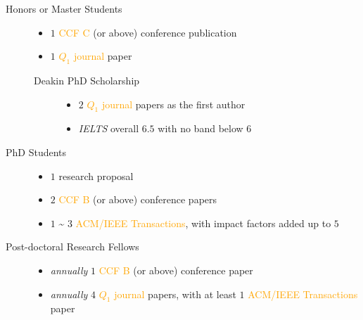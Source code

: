 \documentclass{tikzposter} %
\begin{document}
\begin{columns}
{
	\begin{description}
		\item[Honors or Master Students] \hfill
		\begin{itemize}
			\item $1$ \textcolor{orange}{CCF C} (or above) conference publication
			\item $1$ \textcolor{orange}{$Q_1$ journal} paper
		\end{itemize}
		\begin{description}
			\item[Deakin PhD Scholarship]  \hfill
			\begin{itemize}
				\item $2$ \textcolor{orange}{$Q_1$ journal} papers as the first author
				\item \textit{IELTS} overall $6.5$ with no band below $6$
			\end{itemize}
		\end{description}
	\item[PhD Students] \hfill
	 \begin{itemize}
		\item $1$ research proposal
		\item $2$ \textcolor{orange}{CCF B} (or above) conference papers
		\item $1$ \textasciitilde{} $3$ \textcolor{orange}{ACM/IEEE Transactions},
		with impact factors added up to $5$
	\end{itemize}
	\item[Post-doctoral Research Fellows] \hfill
	\begin{itemize}
		\item \textit{annually} $1$ \textcolor{orange}{CCF B} (or above) conference paper
		\item \textit{annually} $4$ \textcolor{orange}{$Q_1$ journal} papers,
		with at least $1$ \textcolor{orange}{ACM/IEEE Transactions} paper
	\end{itemize}

	\end{description}

}


\end{columns}
\end{document}
